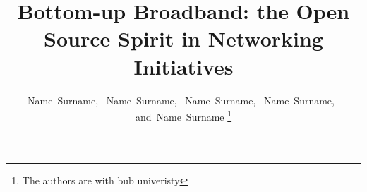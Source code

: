 \documentclass[journal]{IEEEtran}
\begin{document}
%
\title{Bottom-up Broadband: the Open Source Spirit in Networking Initiatives}
%
%
%

\author{
	Name~Surname,~%
    Name~Surname,~%
    Name~Surname,~%
    Name~Surname,~%
    and~Name~Surname%
\thanks{The authors are with bub univeristy}
}


% 
%



% 
\end{document}
